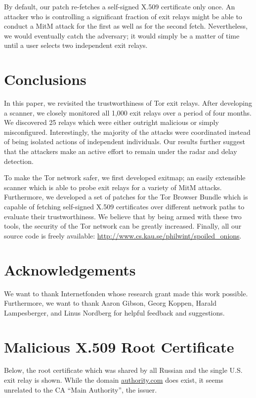\documentclass[letterpaper,twocolumn,10pt]{article}
\begin{document}
By default, our patch re-fetches a self-signed X.509 certificate only once.  An attacker who is
controlling a significant fraction of exit relays might be able to conduct a MitM attack for the
first as well as for the second fetch.  Nevertheless, we would eventually catch the adversary; it
would simply be a matter of time until a user selects two independent exit relays.

\section{Conclusions}
\label{sec:conclusions}
In this paper, we revisited the trustworthiness of Tor exit relays.  After developing a scanner, we
closely monitored all 1,000 exit relays over a period of four months.  We discovered 25 relays
which were either outright malicious or simply misconfigured.  Interestingly, the majority of the
attacks were coordinated instead of being isolated actions of independent individuals.  Our results
further suggest that the attackers make an active effort to remain under the radar and delay
detection.

To make the Tor network safer, we first developed \textsf{exitmap}; an easily extensible scanner
which is able to probe exit relays for a variety of MitM attacks.  Furthermore, we developed a set
of patches for the Tor Browser Bundle which is capable of fetching self-signed X.509 certificates
over different network paths to evaluate their trustworthiness.  We believe that by being armed with
these two tools, the security of the Tor network can be greatly increased.  Finally, all our source
code is freely available: \url{http://www.cs.kau.se/philwint/spoiled_onions}.

\section*{Acknowledgements}
We want to thank Internetfonden whose research grant made this work possible.  Furthermore, we want
to thank Aaron Gibson, Georg Koppen, Harald Lampesberger, and Linus Nordberg for helpful feedback
and suggestions.

\printbibliography

\appendix

\section{Malicious X.509 Root Certificate}
\label{app:x509}
Below, the root certificate which was shared by all Russian and the single U.S. exit relay is shown.
While the domain \url{authority.com} does exist, it seems unrelated to the CA ``Main Authority'',
the issuer.
\end{document}
